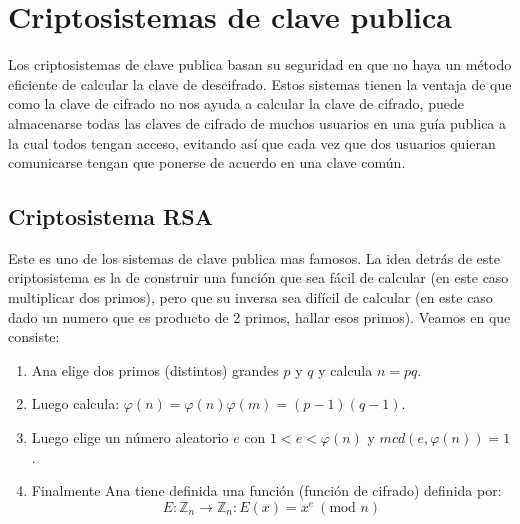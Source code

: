 \documentclass{report}
\begin{document}
\newpage\section{Criptosistemas de clave publica}
Los criptosistemas de clave publica basan su seguridad en que no haya un método eficiente de calcular la clave de descifrado. Estos sistemas tienen la ventaja de que como la clave de cifrado no nos ayuda a calcular la clave de cifrado, puede almacenarse todas las claves de cifrado de muchos usuarios en una guía publica a la cual todos tengan acceso, evitando así que cada vez que dos usuarios quieran comunicarse tengan que ponerse de acuerdo en una clave común.
\subsection{Criptosistema RSA}
Este es uno de los sistemas de clave publica mas famosos. La idea detrás de este criptosistema es la de construir una función que sea fácil de calcular (en este caso multiplicar dos primos), pero que su inversa sea difícil de calcular (en este caso dado un numero que es producto de 2 primos, hallar esos primos). Veamos en que consiste:
\begin{enumerate}
    \item Ana elige dos primos (distintos) grandes $p$ y $q$ y calcula $n=pq$.
    \item Luego calcula: $\varphi(n)=\varphi(n)\varphi(m)=(p-1)(q-1)$.
    \item Luego elige un número aleatorio $e$ con $1<e<\varphi(n)$ y $mcd(e,\varphi(n))=1$.
    \item Finalmente Ana tiene definida una función (función de cifrado) definida por:$$E:\mathbb{Z}_n\to\mathbb{Z}_n:E(x)=x^e\ (\text{mod }n)$$
\end{enumerate}
\end{document}
